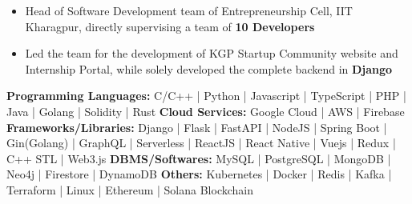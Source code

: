 \documentclass[10pt,a4paper,ragged2e,withhyper]{altacv}
\begin{document}
\begin{paracol}{2}









\hspace*{-1em}  %



\switchcolumn





\begin{itemize}
\item Head of Software Development team of Entrepreneurship Cell, IIT Kharagpur, directly supervising a team of {\bf 10 Developers}
\item Led the team for the development of KGP Startup Community website and Internship Portal, while solely developed the complete backend in {\bf Django}
\end{itemize}

\divider\smallskip



{\bf Programming Languages:} 
C/C++ | Python | Javascript | TypeScript | PHP | Java | Golang | Solidity | Rust
\linebreak
{\bf Cloud Services:} 
Google Cloud | AWS | Firebase
\linebreak
{\bf Frameworks/Libraries:} 
Django | Flask | FastAPI | NodeJS | Spring Boot | Gin(Golang) | GraphQL | Serverless | ReactJS | React Native | Vuejs | Redux | C++ STL | Web3.js
\linebreak
{\bf DBMS/Softwares:} 
MySQL | PostgreSQL | MongoDB | Neo4j | Firestore | DynamoDB
\linebreak
{\bf Others:} 
Kubernetes | Docker | Redis | Kafka | Terraform | Linux | Ethereum | Solana Blockchain




\end{paracol}
\end{document}
